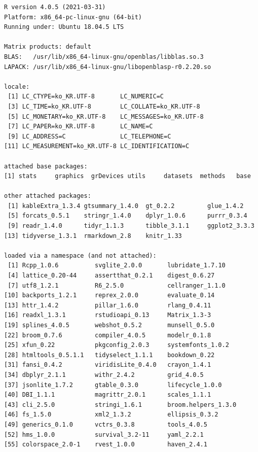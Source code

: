 \documentclass[
  11pt,
]{krantz}
\begin{document}
\begin{verbatim}
R version 4.0.5 (2021-03-31)
Platform: x86_64-pc-linux-gnu (64-bit)
Running under: Ubuntu 18.04.5 LTS

Matrix products: default
BLAS:   /usr/lib/x86_64-linux-gnu/openblas/libblas.so.3
LAPACK: /usr/lib/x86_64-linux-gnu/libopenblasp-r0.2.20.so

locale:
 [1] LC_CTYPE=ko_KR.UTF-8       LC_NUMERIC=C              
 [3] LC_TIME=ko_KR.UTF-8        LC_COLLATE=ko_KR.UTF-8    
 [5] LC_MONETARY=ko_KR.UTF-8    LC_MESSAGES=ko_KR.UTF-8   
 [7] LC_PAPER=ko_KR.UTF-8       LC_NAME=C                 
 [9] LC_ADDRESS=C               LC_TELEPHONE=C            
[11] LC_MEASUREMENT=ko_KR.UTF-8 LC_IDENTIFICATION=C       

attached base packages:
[1] stats     graphics  grDevices utils     datasets  methods   base     

other attached packages:
 [1] kableExtra_1.3.4 gtsummary_1.4.0  gt_0.2.2         glue_1.4.2      
 [5] forcats_0.5.1    stringr_1.4.0    dplyr_1.0.6      purrr_0.3.4     
 [9] readr_1.4.0      tidyr_1.1.3      tibble_3.1.1     ggplot2_3.3.3   
[13] tidyverse_1.3.1  rmarkdown_2.8    knitr_1.33      

loaded via a namespace (and not attached):
 [1] Rcpp_1.0.6          svglite_2.0.0       lubridate_1.7.10   
 [4] lattice_0.20-44     assertthat_0.2.1    digest_0.6.27      
 [7] utf8_1.2.1          R6_2.5.0            cellranger_1.1.0   
[10] backports_1.2.1     reprex_2.0.0        evaluate_0.14      
[13] httr_1.4.2          pillar_1.6.0        rlang_0.4.11       
[16] readxl_1.3.1        rstudioapi_0.13     Matrix_1.3-3       
[19] splines_4.0.5       webshot_0.5.2       munsell_0.5.0      
[22] broom_0.7.6         compiler_4.0.5      modelr_0.1.8       
[25] xfun_0.22           pkgconfig_2.0.3     systemfonts_1.0.2  
[28] htmltools_0.5.1.1   tidyselect_1.1.1    bookdown_0.22      
[31] fansi_0.4.2         viridisLite_0.4.0   crayon_1.4.1       
[34] dbplyr_2.1.1        withr_2.4.2         grid_4.0.5         
[37] jsonlite_1.7.2      gtable_0.3.0        lifecycle_1.0.0    
[40] DBI_1.1.1           magrittr_2.0.1      scales_1.1.1       
[43] cli_2.5.0           stringi_1.6.1       broom.helpers_1.3.0
[46] fs_1.5.0            xml2_1.3.2          ellipsis_0.3.2     
[49] generics_0.1.0      vctrs_0.3.8         tools_4.0.5        
[52] hms_1.0.0           survival_3.2-11     yaml_2.2.1         
[55] colorspace_2.0-1    rvest_1.0.0         haven_2.4.1        
\end{verbatim}
\end{document}
